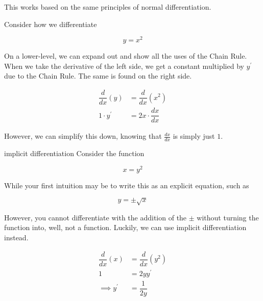 This works based on the same principles of normal differentiation.

Consider how we differentiate

\[ y = x^2 \]

On a lower-level, we can expand out and show all the uses of the Chain Rule. When we take the derivative of the left side, we get a constant multiplied by \( y^\prime \) due to the Chain Rule. The same is found on the right side.

\begin{align}
    \dfrac{d}{dx} \left( y \right) &= \dfrac{d}{dx} \left( x^2 \right) \\
    1 \cdot y^\prime &= 2x \cdot \dfrac{dx}{dx}
\end{align}

However, we can simplify this down, knowing that \( \frac{dx}{dx} \) is simply just \( 1 \).

\begin{example}{implicit differentiation}
    Consider the function
    
    \[ x = y^2 \]
    
    While your first intuition may be to write this as an explicit equation, such as
    
    \[ y = \pm \sqrt{x} \]
    
    However, you cannot differentiate with the addition of the \( \pm \) without turning the function into, well, not a function. Luckily, we can use implicit differentiation instead.
    
    \begin{align}
        \dfrac{d}{dx} \left( x \right) &= \dfrac{d}{dx} \left( y^2 \right) \\
        1 &= 2y y^\prime \\
        \implies y^\prime &= \dfrac{1}{2y}
    \end{align}
\end{example}

